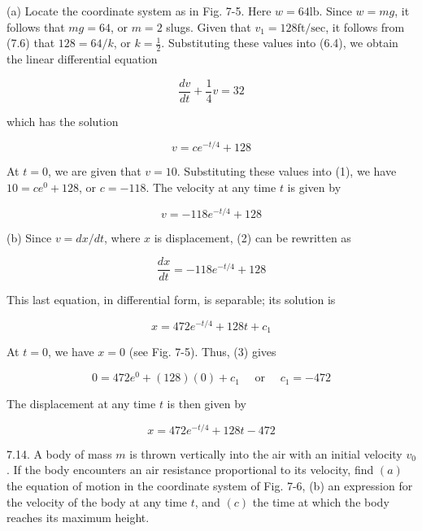 \documentclass[10pt]{article}
\begin{document}
(a) Locate the coordinate system as in Fig. 7-5. Here $w=64 \mathrm{lb}$. Since $w=m g$, it follows that $m g=64$, or $m=2$ slugs. Given that $v_{1}=128 \mathrm{ft} / \mathrm{sec}$, it follows from (7.6) that $128=64 / k$, or $k=\frac{1}{2}$. Substituting these values into (6.4), we obtain the linear differential equation

$$
\frac{d v}{d t}+\frac{1}{4} v=32
$$

which has the solution


\begin{equation*}
v=c e^{-t / 4}+128 \tag{1}
\end{equation*}


At $t=0$, we are given that $v=10$. Substituting these values into (1), we have $10=c e^{0}+128$, or $c=-118$. The velocity at any time $t$ is given by


\begin{equation*}
v=-118 e^{-t / 4}+128 \tag{2}
\end{equation*}


(b) Since $v=d x / d t$, where $x$ is displacement, (2) can be rewritten as

$$
\frac{d x}{d t}=-118 e^{-t / 4}+128
$$

This last equation, in differential form, is separable; its solution is


\begin{equation*}
x=472 e^{-t / 4}+128 t+c_{1} \tag{3}
\end{equation*}


At $t=0$, we have $x=0$ (see Fig. 7-5). Thus, (3) gives

$$
0=472 e^{0}+(128)(0)+c_{1} \quad \text { or } \quad c_{1}=-472
$$

The displacement at any time $t$ is then given by

$$
x=472 e^{-t / 4}+128 t-472
$$

7.14. A body of mass $m$ is thrown vertically into the air with an initial velocity $v_{0}$. If the body encounters an air resistance proportional to its velocity, find $(a)$ the equation of motion in the coordinate system of Fig. 7-6, (b) an expression for the velocity of the body at any time $t$, and $(c)$ the time at which the body reaches its maximum height.
\end{document}
